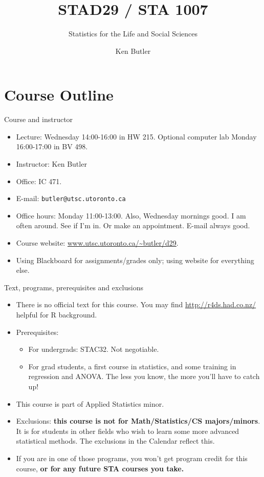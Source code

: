 \documentclass[unknownkeysallowed]{beamer}\usepackage[]{graphicx}\usepackage[]{color}
\title{STAD29 / STA 1007}
\subtitle{Statistics for the Life and Social Sciences}
\author{Ken Butler}
\begin{document}
\maketitle


\section*{Course Outline}
\frame{\sectionpage}

\begin{frame}[fragile]{Course and instructor}
  \begin{itemize}
    \item  Lecture: Wednesday 14:00-16:00 in HW 215. Optional computer
      lab Monday 16:00-17:00 in BV 498.
    \item  Instructor: Ken Butler
    \item  Office: IC 471.
    \item  E-mail: \verb-butler@utsc.utoronto.ca-
    \item Office hours: Monday 11:00-13:00. Also, Wednesday mornings
      good. I am often around. See if I'm in. Or make an
      appointment. E-mail always good.
    \item Course website: 
\url{www.utsc.utoronto.ca/~butler/d29}.
    \item Using Blackboard for assignments/grades only; using website for
      everything else.
\end{itemize}

\end{frame}

\begin{frame}[fragile]{Text, programs, prerequisites and exclusions}

\begin{itemize}
\item There is no official text for this course. You may find
  \url{http://r4ds.had.co.nz/} helpful for R background.
    \item Prerequisites:
      \begin{itemize}
      \item For undergrads: STAC32. Not negotiable.
    \item  For grad students,
      a first course in statistics, and some training in
      regression and ANOVA. The less you know, the more you'll have to
      catch up!
      \end{itemize}

    \item This course is part of Applied Statistics minor.
    \item Exclusions: \textbf{this course is not for
        Math/Statistics/CS majors/minors}. It is for students in other
      fields who wish to learn some more advanced statistical
      methods. The exclusions in the Calendar reflect this. 
    \item If you
      are in one of those programs, you won't get program credit for
      this course, \textbf{or for any future STA courses you take.}
\end{itemize}
  
\end{frame}
\end{document}
